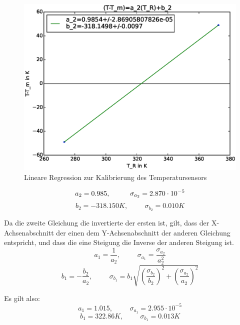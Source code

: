 \documentclass[12pt,a4paper]{article}
\begin{document}
\begin{figure}[H]
\centering
\includegraphics[scale=0.5]{Bilder/lineare_regression_T_kalibration.eps}
\caption{Lineare Regression zur Kalibrierung des Temperatursensors}
\end{figure}

\begin{equation}
a_2=0.985, \hspace{1cm} \sigma_{a_2}=2.870\cdot 10^{-5}\\
\end{equation}
\begin{equation}
b_2=-318.150 K, \hspace{1cm} \sigma_{b_2}=0.010 K
\end{equation}

Da die zweite Gleichung die invertierte der ersten ist, gilt, dass der X-Achsenabschnitt der einen dem Y-Achsenabschnitt der anderen Gleichung entspricht, und dass die eine Steigung die Inverse der anderen Steigung ist.
\begin{equation}
a_1=\frac{1}{a_2}, \hspace{1cm} \sigma_{a_1}=\frac{\sigma_{a_2}}{a_2^2}
\end{equation}
\begin{equation}
b_1=-\frac{b_2}{a_2}, \hspace{1cm} \sigma_{b_1}=b_1 \sqrt{(\frac{\sigma_{b_2}}{b_2})^2+(\frac{\sigma_{a_2}}{a_2})^2}
\end{equation}

Es gilt also:
\begin{equation}
a_1=1.015, \hspace{1cm} \sigma_{a_1}=2.955 \cdot 10^{-5}
\end{equation}
\begin{equation}
b_1=322.86 K, \hspace{1cm} \sigma_{b_1}=0.013 K
\end{equation}
\end{document}
